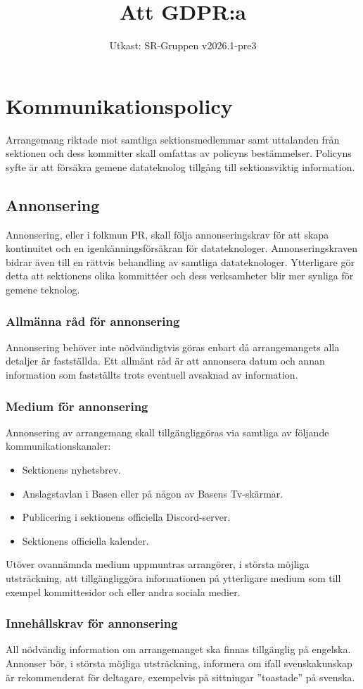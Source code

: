 \documentclass[a4paper]{dtek}
\title{Att GDPR:a}
\date{Utkast: SR-Gruppen v2026.1-pre3}
\begin{document}
\section{Kommunikationspolicy}
Arrangemang riktade mot samtliga sektionsmedlemmar samt uttalanden från sektionen och dess kommitter skall omfattas av policyns bestämmelser. Policyns syfte är att försäkra gemene datateknolog tillgång till sektionsviktig information.

\subsection{Annonsering}
Annonsering, eller i folkmun PR, skall följa annonseringskrav för att skapa kontinuitet
och en igenkänningsförsäkran för datateknologer. Annonseringskraven bidrar även till en
rättvis behandling av samtliga datateknologer. Ytterligare gör detta att sektionens olika
kommittéer och dess verksamheter blir mer synliga för gemene teknolog.

\subsubsection{Allmänna råd för annonsering}
Annonsering behöver inte nödvändigtvis göras enbart då arrangemangets alla detaljer är
fastställda. Ett allmänt råd är att annonsera datum och annan information som fastställts
trots eventuell avsaknad av information.

\subsubsection{Medium för annonsering}
Annonsering av arrangemang skall tillgängliggöras via samtliga av följande kommunikationskanaler:
\begin{itemize}
    \item Sektionens nyhetsbrev.
    \item Anslagstavlan i Basen eller på någon av Basens Tv-skärmar.
    \item Publicering i sektionens officiella Discord-server.
    \item Sektionens officiella kalender.
\end{itemize}
Utöver ovannämnda medium uppmuntras arrangörer, i största möjliga utsträckning, att
tillgängliggöra informationen på ytterligare medium som till exempel kommittesidor och
 eller andra sociala medier.

\subsubsection{Innehållskrav för annonsering}
All nödvändig information om arrangemanget ska finnas tillgänglig på engelska. Annonser
bör, i största möjliga utsträckning, informera om ifall svenskakunskap är rekommenderat
för deltagare, exempelvis på sittningar ”toastade” på svenska.
\end{document}
